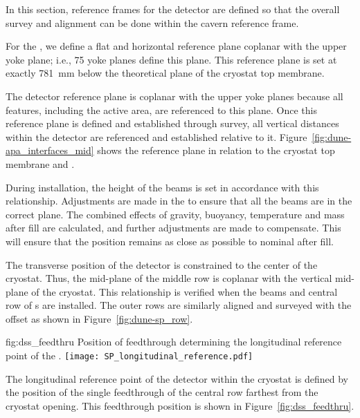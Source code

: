 In this section, reference frames for the detector are defined so that the
overall survey and alignment can be done within the cavern reference
frame. 


For the , we define a flat and horizontal reference plane
coplanar with the upper  yoke plane; i.e., 75 yoke planes
define this plane. This reference plane is set at exactly \SI{781}{mm}
below the theoretical plane of the cryostat top membrane.


The detector reference plane is coplanar with the upper 
yoke planes because all features, including the active area, are
referenced to this plane. Once this reference plane is defined and
established through survey, all vertical distances within the detector
are referenced and established relative to it.
Figure~\ref{fig:dune-apa_interfaces_mid} shows the reference plane in
relation to the cryostat top membrane and .


During installation, the height of the  beams is set in
accordance with this relationship. Adjustments are made in the
 to ensure that all the beams are in the correct plane. The
combined effects of gravity, buoyancy, temperature and 
mass after fill are calculated, and further adjustments are made to
compensate.  This will ensure that the  position remains as
close as possible to nominal after fill.


The transverse position of the detector is constrained to the center
of the cryostat. Thus, the mid-plane of the middle row  is
coplanar with the vertical mid-plane of the cryostat. This
relationship is verified when the  beams and central row of
s are installed. The outer rows are similarly aligned and
surveyed with the offset as shown in Figure~\ref{fig:dune-sp_row}.
\begin{dunefigure}{fig:dss_feedthru}
  {Position of feedthrough determining the longitudinal reference point of the .}
  \texttt{[image: SP\_longitudinal\_reference.pdf]}
\end{dunefigure}


The longitudinal reference point of the detector within the cryostat
is defined by the position of the single feedthrough of the central row
farthest from the cryostat opening. This feedthrough position
is shown in Figure~\ref{fig:dss_feedthru}.

